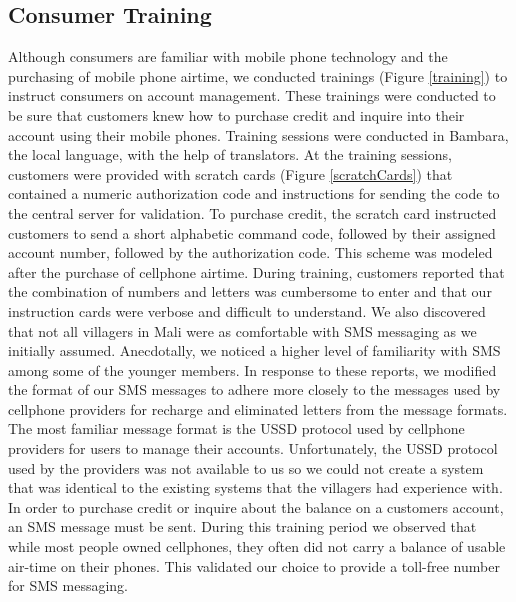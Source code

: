 \documentclass{sig-alternate}
\begin{document}
\subsection{Consumer Training}
Although consumers are familiar with mobile phone technology and the
purchasing of mobile phone airtime, we conducted trainings (Figure \ref{training})
to instruct consumers on account management.
These trainings were conducted to be sure that customers knew how to
purchase credit and inquire into their account using their mobile
phones.
Training sessions were conducted in Bambara, the local language, with
the help of translators.
At the training sessions, customers were provided with scratch cards (Figure
\ref{scratchCards}) that contained a numeric authorization code and
instructions for sending the code to the central server for
validation.
To purchase credit, the scratch card instructed customers to send a
short alphabetic command code, followed by their assigned account
number, followed by the authorization code.
This scheme was modeled after the purchase of cellphone airtime.
During training, customers reported that the combination of numbers and letters was
cumbersome to enter and that our instruction cards were verbose and
difficult to understand.
We also discovered that not all villagers in Mali were as
comfortable with SMS messaging as we initially assumed.
Anecdotally, we noticed a higher level of familiarity with SMS
among some of the younger members.
In response to these reports, we modified the format of our SMS messages
to adhere more closely to the messages used by cellphone providers for
recharge and eliminated letters from the message formats.
The most familiar message format is the USSD protocol used by
cellphone providers for users to manage their accounts.
Unfortunately, the USSD protocol used by the providers was not available
to us so we could not create a system that was identical to the existing
systems that the villagers had experience with.
In order to purchase credit or inquire about the balance on a customers
account, an SMS message must be sent.
During this training period we observed that while most people owned
cellphones, they often did not carry a balance of usable air-time on
their phones.
This validated our choice to provide a toll-free number for SMS messaging.
\end{document}
